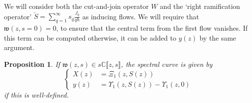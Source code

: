 \documentclass[10pt,a4paper,oneside,no-math,reqno]{amsart}%
\theoremstyle{plain}
\newtheorem{proposition}[theorem]{Proposition}
\theoremstyle{definition}
\theoremstyle{remark}
\numberwithin{equation}{section}
\newcommand{\mb}[1]{\mathbb{#1}}
\newcommand{\mf}[1]{\mathfrak{#1}}
\newcommand{\1}{\mathds{1}}
\newcommand{\C}{\mb{C}}
\newcommand{\<}{\langle}
\renewcommand{\>}{\rangle}
\begin{document}
We will consider both the cut-and-join operator $ W$ and the `right ramification operator' $ \check{S} = \sum_{q=1}^\infty s_q \frac{J_q}{q\hbar} $ as inducing flows. We will require that $ \mf{w} (z, s= 0) = 0$, to ensure that the central term from the first flow vanishes. If this term can be computed otherwise, it can be added to $ y(z)$ by the same argument.

\begin{proposition}\label{GeneralSC}
	If $ \mf{w}(z,s) \in s\C \llbracket z, s\rrbracket $, the spectral curve is given by 
	\begin{equation}
		\begin{cases}
			X(z)
			&=
			\Xi_1 (z, S(z))
			\\
			y (z)
			&=
			\Upsilon_1 (z, S(z)) - \Upsilon_1 (z, 0)
		\end{cases} 
	\end{equation}
	if this is well-defined.
\end{proposition}
\end{document}
